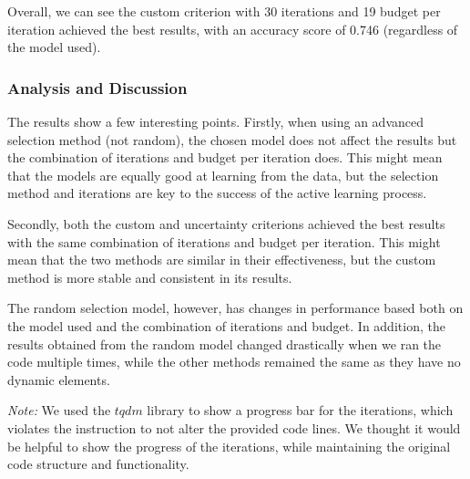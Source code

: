 \documentclass[12pt]{article}
\begin{document}
Overall, we can see the custom criterion with 30 iterations and 19 budget per iteration achieved the best results, with an accuracy score of 0.746 (regardless of the model used).

\subsubsection*{Analysis and Discussion}

The results show a few interesting points. Firstly, when using an advanced selection method (not random), the chosen model does not affect the results but the combination of iterations and budget per iteration does. This might mean that the models are equally good at learning from the data, but the selection method and iterations are key to the success of the active learning process.

Secondly, both the custom and uncertainty criterions achieved the best results with the same combination of iterations and budget per iteration. This might mean that the two methods are similar in their effectiveness, but the custom method is more stable and consistent in its results.

The random selection model, however, has changes in performance based both on the model used and the combination of iterations and budget. In addition, the results obtained from the random model changed drastically when we ran the code multiple times, while the other methods remained the same as they have no dynamic elements. 


\vspace{1em}
\textsl{Note:} We used the $tqdm$ library to show a progress bar for the iterations, which violates the instruction to not alter the provided code lines. We thought it would be helpful to show the progress of the iterations, while maintaining the original code structure and functionality.
\end{document}

